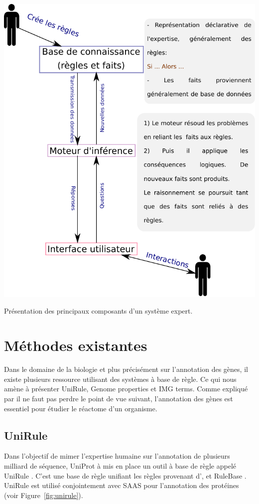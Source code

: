 \begin{refsegment}
    \begin{shadedfigure}[H]
        \centering
        \includegraphics[width=\textwidth]{img/systeme_expert.pdf}
        \caption{Présentation des principaux composants d'un système expert.}
        \label{fig:systeme_expert}
    \end{shadedfigure}
    
    \section{Méthodes existantes}
    
    Dans le domaine de la biologie et plus précisément sur l'annotation des gènes, il existe plusieurs ressource utilisant des systèmes à base de règle. Ce qui nous amène à présenter UniRule, Genome properties et IMG terms. Comme expliqué par \citeauthor{dale2010machine}\cite{dale2010machine} il ne faut pas perdre le point de vue suivant, l'annotation des gènes est essentiel pour étudier le réactome d'un organisme.
    
    \subsection{UniRule}
    Dans l'objectif de mimer l'expertise humaine sur l'annotation de plusieurs milliard de séquence, UniProt à mis en place un outil à base de règle appelé UniRule \cite{unirule2015,bridge2010unirule}. C'est une base de règle unifiant les règles provenant d',  et RuleBase . UniRule est utilisé conjointement avec \acrfull{SAAS} \cite{kretschmann2001automatic,uniprot2015} pour l'annotation des protéines (voir Figure~\cref{fig:unirule}).
    

\end{refsegment}
